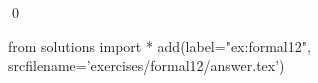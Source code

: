 
\begin{ex} 
  \label{ex:formal12}
  
  \qed
\end{ex} 
\begin{python0}
from solutions import *
add(label="ex:formal12",
    srcfilename='exercises/formal12/answer.tex') 
\end{python0}
